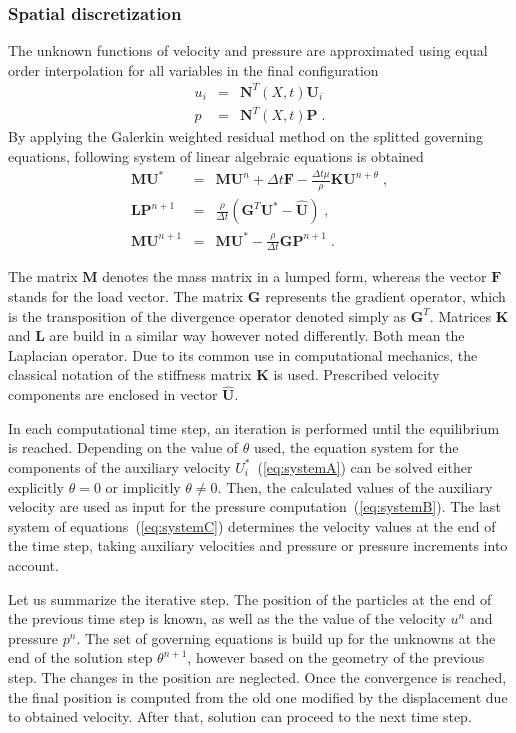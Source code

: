 \documentclass[a4paper]{report}
\newcommand{\mbf}[1]{\boldsymbol{#1}}
\begin{document}
\subsubsection{Spatial discretization}
The unknown functions of velocity and pressure are approximated using equal order interpolation for all variables in the final configuration
\begin{eqnarray}
u_i&=&\mbf{N}^T(X,t)\mbf{U}_i\\
p&=&\mbf{N}^T(X,t)\mbf{P} \;.
\end{eqnarray}
By applying the Galerkin weighted residual method on the splitted governing equations, following system of linear algebraic equations is obtained 
\begin{eqnarray}
\mbf{M}\mbf{U}^* &=& \mbf{M}\mbf{U}^n + \Delta t\mbf{F} - \frac{\Delta t\mu}{\rho}\mbf{K}\mbf{U}^{n+\theta}\;,\label{eq:systemA} \\
\mbf{L}\mbf{P}^{n+1} &=&\frac{\rho}{\Delta t}\left(\mbf{G}^T\mbf{U}^*-\hat{\mbf{U}}\right) \;, \label{eq:systemB} \\
\mbf{M}\mbf{U}^{n+1} &=& \mbf{M}\mbf{U}^* - \frac{\rho}{\Delta t}\mbf{G}\mbf{P}^{n+1} \;.\label{eq:systemC}
\end{eqnarray}
\par
The matrix $\mbf{M}$ denotes the mass matrix in a lumped form, whereas the vector $\mbf{F}$ stands for the load vector. The matrix $\mbf{G}$ represents the gradient operator, which is the transposition of the divergence operator denoted simply as $\mbf{G}^T$. Matrices $\mbf{K}$ and $\mbf{L}$ are build in a similar way however noted differently. Both mean the Laplacian operator. Due to its common use in computational mechanics, the classical notation of the stiffness matrix $\mbf{K}$ is used. Prescribed velocity components are enclosed in vector $\hat{\mbf{U}}$.
\par
In each computational time step, an iteration is performed until the equilibrium is reached. Depending on the value of $\theta$ used, the equation system for the components of the auxiliary velocity $U^*_i$~(\ref{eq:systemA}) can be solved either explicitly $\theta = 0$ or implicitly $\theta \neq 0$. Then, the calculated values of the auxiliary velocity are used as input for the pressure computation~(\ref{eq:systemB}). The last system of equations~(\ref{eq:systemC}) determines the velocity values at the end of the time step, taking auxiliary velocities and pressure or pressure increments into account.
\par
Let us summarize the iterative step. The position of the particles at the end of the previous time step is known, as well as the the value of the velocity $u^n$ and pressure $p^n$. The set of governing equations is build up for the unknowns at the end of the solution step $\theta^{n+1}$, however based on the geometry of the previous step. The changes in the position are neglected. Once the convergence is reached, the final position is computed from the old one modified by the displacement due to obtained velocity. After that, solution can proceed to the next time step.
\end{document}

